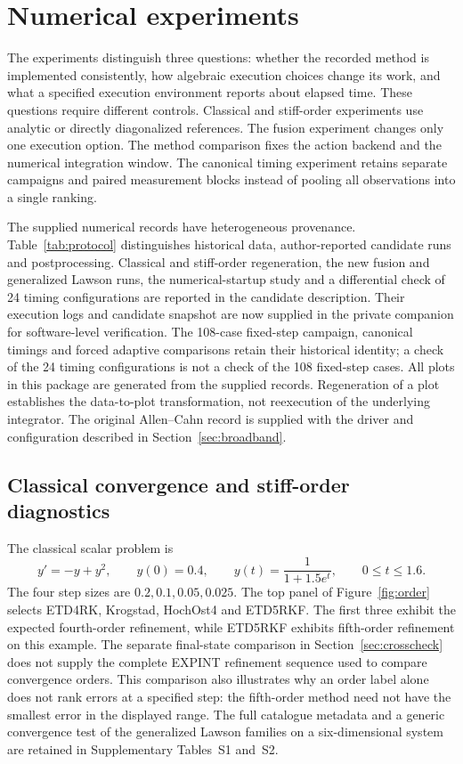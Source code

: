 \section{Numerical experiments}\label{sec:experiments}

The experiments distinguish three questions: whether the recorded method is
implemented consistently, how algebraic execution choices change its work, and
what a specified execution environment reports about elapsed time.  These
questions require different controls.  Classical and stiff-order experiments
use analytic or directly diagonalized references.  The fusion experiment
changes only one execution option.  The method comparison fixes the action
backend and the numerical integration window.  The canonical timing experiment
retains separate campaigns and paired measurement blocks instead of pooling
all observations into a single ranking.

The supplied numerical records have heterogeneous provenance.
Table~\ref{tab:protocol} distinguishes historical data, author-reported
candidate runs and postprocessing.  Classical and stiff-order regeneration,
the new fusion and generalized Lawson runs, the numerical-startup study and
a differential check of 24 timing configurations are reported in the
candidate description.  Their execution logs and candidate snapshot are
now supplied in the private companion for software-level verification.  The 108-case fixed-step
campaign, canonical timings and forced adaptive comparisons retain their
historical identity; a check of the 24 timing configurations is not a check of
the 108 fixed-step cases.  All plots in this package are generated from the
supplied records.  Regeneration of a plot establishes the data-to-plot
transformation, not reexecution of the underlying integrator.  The original Allen--Cahn record is supplied with the driver and
configuration described in Section~\ref{sec:broadband}.


\subsection{Classical convergence and stiff-order diagnostics}\label{sec:orders}

The classical scalar problem is
\begin{equation}
 y'=-y+y^2,\qquad y(0)=0.4,\qquad
 y(t)=\frac{1}{1+1.5e^t},\qquad 0\le t\le1.6.
\end{equation}
The four step sizes are $0.2,0.1,0.05,0.025$.  The top panel of
Figure~\ref{fig:order} selects ETD4RK, Krogstad, HochOst4 and ETD5RKF.  The
first three exhibit the expected fourth-order refinement, while ETD5RKF
exhibits fifth-order refinement on this example.  The separate final-state
comparison in Section~\ref{sec:crosscheck} does not supply the complete
EXPINT refinement sequence used to compare convergence orders.  This comparison also illustrates why an order
label alone does not rank errors at a specified step: the fifth-order method
need not have the smallest error in the displayed range.  The full catalogue
metadata and a generic convergence test of the generalized Lawson families on
a six-dimensional system are retained in Supplementary Tables~S1 and~S2.


